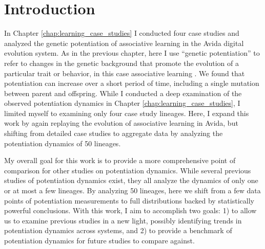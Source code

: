 


\section{Introduction}

In Chapter \ref{chap:learning_case_studies} I conducted four case studies and analyzed the genetic potentiation of associative learning in the Avida digital evolution system. 
As in the previous chapter, here I use ``genetic potentiation'' to refer to changes in the genetic background that promote the evolution of a particular trait or behavior, in this case associative learning \citep{blountHistoricalContingencyEvolution2008}.
We found that potentiation can increase over a short period of time, including a single mutation between parent and offspring. 
While I conducted a deep examination of the observed potentiation dynamics in Chapter \ref{chap:learning_case_studies}, I limited myself to examining only four case study lineages. 
Here, I expand this work by again replaying the evolution of associative learning in Avida, but shifting from detailed case studies to aggregate data by analyzing the potentiation dynamics of 50 lineages. 

My overall goal for this work is to provide a more comprehensive point of comparison for other studies on potentiation dynamics. 
While several previous studies of potentiation dynamics exist, they all analyze the dynamics of only one or at most a few lineages.
By analyzing 50 lineages, here we shift from a few data points of potentiation measurements to full distributions backed by statistically powerful conclusions. %
With this work, I aim to accomplish two goals: 
1) to allow us to examine previous studies in a new light, possibly identifying trends in potentiation dynamics across systems, and 
2) to provide a benchmark of potentiation dynamics for future studies to compare against.


